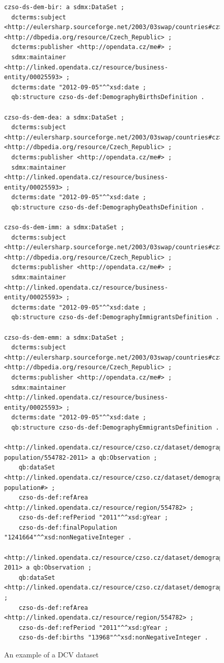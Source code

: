 \begin{figure}
\begin{verbatim}
czso-ds-dem-bir: a sdmx:DataSet ;
  dcterms:subject <http://eulersharp.sourceforge.net/2003/03swap/countries#cz>, <http://dbpedia.org/resource/Czech_Republic> ;
  dcterms:publisher <http://opendata.cz/me#> ;
  sdmx:maintainer <http://linked.opendata.cz/resource/business-entity/00025593> ;
  dcterms:date "2012-09-05"^^xsd:date ;
  qb:structure czso-ds-def:DemographyBirthsDefinition .
  
czso-ds-dem-dea: a sdmx:DataSet ;
  dcterms:subject <http://eulersharp.sourceforge.net/2003/03swap/countries#cz>, <http://dbpedia.org/resource/Czech_Republic> ;
  dcterms:publisher <http://opendata.cz/me#> ;
  sdmx:maintainer <http://linked.opendata.cz/resource/business-entity/00025593> ;
  dcterms:date "2012-09-05"^^xsd:date ;
  qb:structure czso-ds-def:DemographyDeathsDefinition .
  
czso-ds-dem-imm: a sdmx:DataSet ;
  dcterms:subject <http://eulersharp.sourceforge.net/2003/03swap/countries#cz>, <http://dbpedia.org/resource/Czech_Republic> ;
  dcterms:publisher <http://opendata.cz/me#> ;
  sdmx:maintainer <http://linked.opendata.cz/resource/business-entity/00025593> ;
  dcterms:date "2012-09-05"^^xsd:date ;
  qb:structure czso-ds-def:DemographyImmigrantsDefinition .
  
czso-ds-dem-emm: a sdmx:DataSet ;
  dcterms:subject <http://eulersharp.sourceforge.net/2003/03swap/countries#cz>, <http://dbpedia.org/resource/Czech_Republic> ;
  dcterms:publisher <http://opendata.cz/me#> ;
  sdmx:maintainer <http://linked.opendata.cz/resource/business-entity/00025593> ;
  dcterms:date "2012-09-05"^^xsd:date ;
  qb:structure czso-ds-def:DemographyEmmigrantsDefinition .
  
<http://linked.opendata.cz/resource/czso.cz/dataset/demography/final-population/554782-2011> a qb:Observation ;
    qb:dataSet <http://linked.opendata.cz/resource/czso.cz/dataset/demography/final-population#> ;
    czso-ds-def:refArea <http://linked.opendata.cz/resource/region/554782> ;
    czso-ds-def:refPeriod "2011"^^xsd:gYear ;
    czso-ds-def:finalPopulation "1241664"^^xsd:nonNegativeInteger .

<http://linked.opendata.cz/resource/czso.cz/dataset/demography/births/554782-2011> a qb:Observation ;
    qb:dataSet <http://linked.opendata.cz/resource/czso.cz/dataset/demography/births#> ;
    czso-ds-def:refArea <http://linked.opendata.cz/resource/region/554782> ;
    czso-ds-def:refPeriod "2011"^^xsd:gYear ;
    czso-ds-def:births "13968"^^xsd:nonNegativeInteger .
\end{verbatim}\normalsize
\caption{An example of a DCV dataset}
\label{fig:example-dcv-dataset}
\end{figure}

